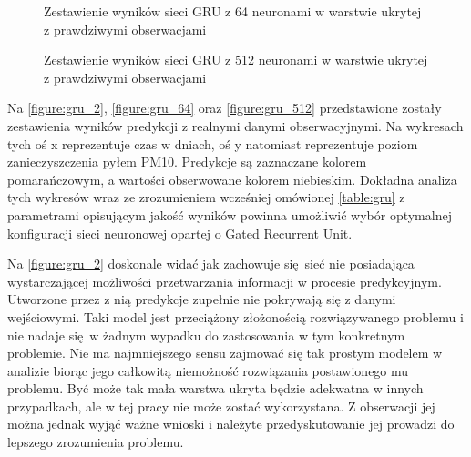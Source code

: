 \documentclass[10pt,a4paper]{article}
\begin{document}
\FloatBarrier
\begin{figure}[!ht]
	\centering
	\caption{Zestawienie wyników sieci GRU z 64 neuronami w warstwie ukrytej z prawdziwymi obserwacjami}
	\label{figure:gru_64}
\end{figure}
\FloatBarrier
\begin{figure}[!ht]
	\centering
	\caption{Zestawienie wyników sieci GRU z 512 neuronami w warstwie ukrytej z prawdziwymi obserwacjami}
	\label{figure:gru_512}
\end{figure}
\FloatBarrier

Na \autoref{figure:gru_2}, \autoref{figure:gru_64} oraz \autoref{figure:gru_512} przedstawione zostały zestawienia wyników predykcji z realnymi danymi obserwacyjnymi. Na wykresach tych oś x reprezentuje czas w dniach, oś y natomiast reprezentuje poziom zanieczyszczenia pyłem PM10. Predykcje są zaznaczane kolorem pomarańczowym, a wartości obserwowane kolorem niebieskim. Dokładna analiza tych wykresów wraz ze zrozumieniem wcześniej omówionej \autoref{table:gru} z parametrami opisującym jakość wyników powinna umożliwić wybór optymalnej konfiguracji sieci neuronowej opartej o Gated Recurrent Unit.

Na \autoref{figure:gru_2} doskonale widać jak zachowuje się sieć nie posiadająca wystarczającej możliwości przetwarzania informacji w procesie predykcyjnym. Utworzone przez z nią predykcje zupełnie nie pokrywają się z danymi wejściowymi. Taki model jest przeciążony złożonością rozwiązywanego problemu i nie nadaje się w żadnym wypadku do zastosowania w tym konkretnym problemie. Nie ma najmniejszego sensu zajmować się tak prostym modelem w analizie biorąc jego całkowitą niemożność rozwiązania postawionego mu problemu. Być może tak mała warstwa ukryta będzie adekwatna w innych przypadkach, ale w tej pracy nie może zostać wykorzystana. Z obserwacji jej można jednak wyjąć ważne wnioski i należyte przedyskutowanie jej prowadzi do lepszego zrozumienia problemu. 
\end{document}
